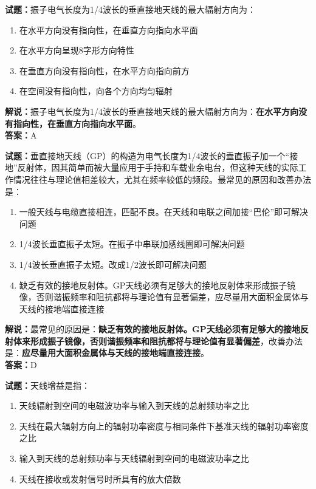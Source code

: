 \documentclass{ctexbook}
\begin{document}
\noindent\textbf{试题：}振子电气长度为1/4波长的垂直接地天线的最大辐射方向为：

\begin{enumerate}[leftmargin=3em]
	\item 在水平方向没有指向性，在垂直方向指向水平面
	\item 在水平方向呈现8字形方向特性
	\item 在垂直方向没有指向性，在水平方向指向前方
	\item 在空间没有指向性，向各个方向均匀辐射
\end{enumerate}

\noindent\textbf{解说：}振子电气长度为1/4波长的垂直接地天线的最大辐射方向为：\textbf{在水平方向没有指向性，在垂直方向指向水平面}。\\\noindent\textbf{答案：}A%


\bigskip


\noindent\textbf{试题：}垂直接地天线（GP）的构造为电气长度为1/4波长的垂直振子加一个“接地”反射体，因其简单而被大量应用于手持和车载业余电台，但这种天线的实际工作情况往往与理论值相差较大，尤其在频率较低的频段。最常见的原因和改善办法是：

\begin{enumerate}[leftmargin=3em]
	\item 一般天线与电缆直接相连，匹配不良。在天线和电联之间加接“巴伦”即可解决问题
	\item 1/4波长垂直振子太短。在振子中串联加感线圈即可解决问题
	\item 1/4波长垂直振子太短。改成1/2波长即可解决问题
	\item 缺乏有效的接地反射体。GP天线必须有足够大的接地反射体来形成振子镜像，否则谐振频率和阻抗都将与理论值有显著偏差，应尽量用大面积金属体与天线的接地端直接连接
\end{enumerate}

\noindent\textbf{解说：}最常见的原因是：\textbf{缺乏有效的接地反射体。GP天线必须有足够大的接地反射体来形成振子镜像，否则谐振频率和阻抗都将与理论值有显著偏差}，改善办法是：\textbf{应尽量用大面积金属体与天线的接地端直接连接}。\\\noindent\textbf{答案：}D


\bigskip


\noindent\textbf{试题：}天线增益是指：

\begin{enumerate}[leftmargin=3em]
	\item 天线辐射到空间的电磁波功率与输入到天线的总射频功率之比
	\item 天线在最大辐射方向上的辐射功率密度与相同条件下基准天线的辐射功率密度之比
	\item 输入到天线的总射频功率与天线辐射到空间的电磁波功率之比
	\item 天线在接收或发射信号时所具有的放大倍数
\end{enumerate}
\end{document}

